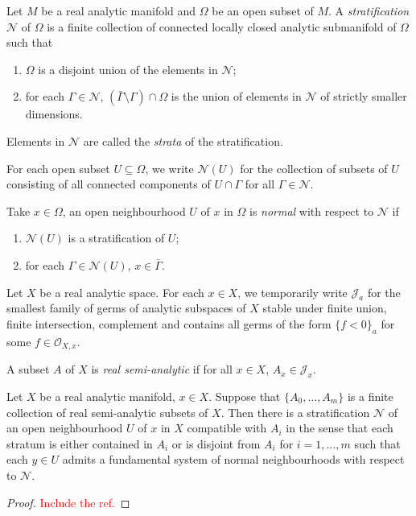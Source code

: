 \begin{definition}
    Let $M$ be a real analytic manifold and $\Omega$ be an open subset of $M$. A \emph{stratification} $\mathcal{N}$ of $\Omega$ is a finite collection of connected locally closed analytic submanifold of $\Omega$ such that
    \begin{enumerate}
        \item $\Omega$ is a disjoint union of the elements in $\mathcal{N}$;
        \item for each $\Gamma\in \mathcal{N}$, $(\bar{\Gamma}\setminus \Gamma)\cap \Omega$ is the union of elements in $\mathcal{N}$ of strictly smaller dimensions.
    \end{enumerate}
    Elements in $\mathcal{N}$ are called the \emph{strata} of the stratification.

    For each open subset $U\subseteq \Omega$, we write $\mathcal{N}(U)$ for the collection of subsets of $U$ consisting of all connected components of $U\cap \Gamma$ for all $\Gamma\in \mathcal{N}$.

    Take $x\in \Omega$, an open neighbourhood $U$ of $x$ in $\Omega$ is \emph{normal} with respect to $\mathcal{N}$ if 
    \begin{enumerate}
        \item $\mathcal{N}(U)$ is a stratification of $U$;
        \item for each $\Gamma\in \mathcal{N}(U)$, $x\in \bar{\Gamma}$.
    \end{enumerate}
\end{definition}

\begin{definition}
    Let $X$ be a real analytic space. For each $x\in X$, we temporarily write $\mathcal{J}_a$ for the smallest family of germs of analytic subspaces of $X$ stable under finite union, finite intersection, complement and contains all germs of the form $\{f<0\}_a$ for some $f\in \mathcal{O}_{X,x}$.

    A subset $A$ of $X$ is \emph{real semi-analytic} if for all $x\in X$, $A_x\in \mathcal{J}_x$.
\end{definition}

\begin{thm}\label{thm-refinesemianatostratification}
    Let $X$ be a real analytic manifold, $x\in X$. Suppose that $\{A_0,\ldots,A_m\}$ is a finite collection of real semi-analytic subsets of $X$. Then there is a stratification $\mathcal{N}$ of an open neighbourhood $U$ of $x$ in $X$ compatible with $A_i$ in the sense that each stratum is either contained in $A_i$ or is disjoint from $A_i$ for $i=1,\ldots,m$ such that each $y\in U$ admits a fundamental system of normal neighbourhoods with respect to $\mathcal{N}$.
\end{thm}
\begin{proof}
    \textcolor{red}{Include the ref.}
\end{proof}



